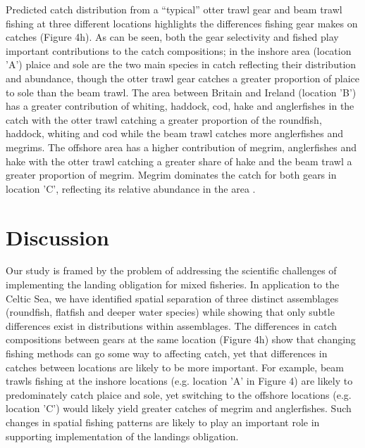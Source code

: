 \documentclass[fleqn,10pt]{wlscirep}
\begin{document}
\begin{linenumbers}
Predicted catch distribution from a ``typical'' otter trawl gear and beam trawl
fishing at three different locations highlights the differences fishing gear
makes on catches (Figure 4h). As can be seen, both the gear selectivity and
 fished play important contributions to the
catch compositions; in the inshore area (location 'A') plaice and sole are the
two main species in  catch reflecting their distribution and
abundance, though the otter trawl gear catches a greater proportion of plaice
to sole than the beam trawl.  The area between Britain and Ireland (location
'B') has a greater contribution of whiting, haddock, cod, hake and anglerfishes
in the catch with the otter trawl catching a greater proportion of the
roundfish, haddock, whiting and cod while the beam trawl catches more
anglerfishes and megrims. The offshore area has a higher contribution of
megrim, anglerfishes and hake with the otter trawl catching a greater share of
hake and the beam trawl a greater proportion of megrim. Megrim dominates the
catch for both gears in location 'C', reflecting its relative abundance in the
area .  \\

\section*{Discussion\\}

Our study is framed by the problem of addressing the scientific challenges of
implementing the landing obligation for mixed fisheries. In application to the
Celtic Sea, we have identified spatial separation of three distinct
assemblages (roundfish, flatfish and deeper water species) while showing
that only subtle differences exist in distributions within assemblages. The
differences in catch compositions between gears at the same location (Figure
4h) show that changing fishing methods can go some way to affecting catch, yet
that differences in catches between locations are likely to be more important.
For example, beam trawls fishing at the inshore locations (e.g. location 'A' in
Figure 4) are likely to predominately catch plaice and sole, yet switching to
the offshore locations (e.g. location 'C') would likely yield greater catches
of megrim and anglerfishes.  Such changes in spatial fishing patterns are
likely to play an important role in supporting implementation of the landings
obligation.\\


\end{linenumbers}
\end{document}
